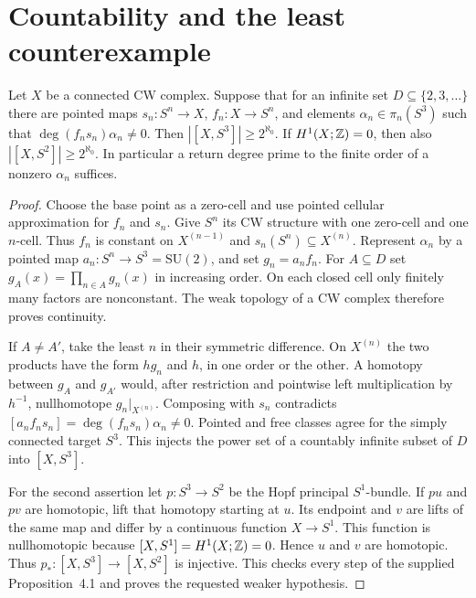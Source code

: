 \section{Countability and the least counterexample}
\label{sec:countability}

\begin{proposition}
\label{B:spherecriterion}
Let $X$ be a connected CW complex. Suppose that for an infinite set
$D\subseteq\{2,3,\ldots\}$ there are pointed maps
$s_n:S^n\to X$, $f_n:X\to S^n$, and elements
$\alpha_n\in\pi_n(S^3)$ such that
$\deg(f_ns_n)\alpha_n\ne0$. Then
$|[X,S^3]|\geq2^{\aleph_0}$. If $H^1(X;\mathbb Z)=0$, then also
$|[X,S^2]|\geq2^{\aleph_0}$.
In particular a return degree prime to the finite order of a nonzero
$\alpha_n$ suffices.
\end{proposition}
\begin{proof}
Choose the base point as a zero-cell and use pointed cellular approximation
for $f_n$ and $s_n$. Give $S^n$ its CW structure with one zero-cell and
one $n$-cell. Thus $f_n$ is constant on $X^{(n-1)}$ and
$s_n(S^n)\subseteq X^{(n)}$. Represent $\alpha_n$ by a pointed map
$a_n:S^n\to S^3=\mathrm{SU}(2)$, and set $g_n=a_nf_n$.
For $A\subseteq D$ set $g_A(x)=\prod_{n\in A}g_n(x)$ in increasing
order. On each closed cell only finitely many factors are nonconstant.
The weak topology of a CW complex therefore proves continuity.

If $A\ne A'$, take the least $n$ in their symmetric difference. On
$X^{(n)}$ the two products have the form $h g_n$ and $h$, in one
order or the other. A homotopy between $g_A$ and $g_{A'}$ would,
after restriction and pointwise left multiplication by $h^{-1}$, nullhomotope
$g_n|_{X^{(n)}}$. Composing with $s_n$ contradicts
$[a_nf_ns_n]=\deg(f_ns_n)\alpha_n\ne0$. Pointed and free classes
agree for the simply connected target $S^3$. This injects the power set
of a countably infinite subset of $D$ into $[X,S^3]$.

For the second assertion let $p:S^3\to S^2$ be the Hopf principal
$S^1$-bundle. If $p u$ and $p v$ are homotopic, lift that homotopy
starting at $u$. Its endpoint and $v$ are lifts of the same map and
differ by a continuous function $X\to S^1$. This function is
nullhomotopic because $[X,S^1]=H^1(X;\mathbb Z)=0$. Hence $u$ and $v$
are homotopic. Thus $p_*:[X,S^3]\to[X,S^2]$ is injective.
This checks every step of the supplied Proposition~4.1 and proves
the requested weaker hypothesis.
\end{proof}

